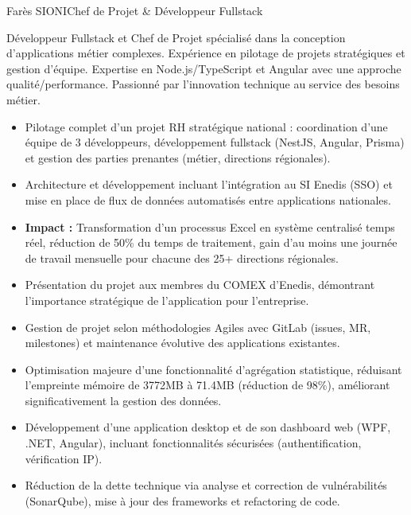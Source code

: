 \documentclass[a4paper,11pt]{article}
\begin{document}
\begin{cv}[profile][2]
{Farès SIONI}{Chef de Projet \& Développeur Fullstack}

    Développeur Fullstack et Chef de Projet spécialisé dans la conception d'applications métier complexes.
    Expérience en pilotage de projets stratégiques et gestion d'équipe.
    Expertise en Node.js/TypeScript et Angular avec une approche qualité/performance.
    Passionné par l'innovation technique au service des besoins métier.

    \begin{cvevent}[08/2023][08/2025]
        \begin{itemize}
            \item Pilotage complet d'un projet RH stratégique national : coordination d'une équipe de 3 développeurs, développement fullstack (NestJS, Angular, Prisma) et gestion des parties prenantes (métier, directions régionales).
            \item Architecture et développement incluant l'intégration au SI Enedis (SSO) et mise en place de flux de données automatisés entre applications nationales.
            \item \textbf{Impact :} Transformation d'un processus Excel en système centralisé temps réel, réduction de 50\% du temps de traitement, gain d'au moins une journée de travail mensuelle pour chacune des 25+ directions régionales.
            \item Présentation du projet aux membres du COMEX d'Enedis, démontrant l'importance stratégique de l'application pour l'entreprise.
            \item Gestion de projet selon méthodologies Agiles avec GitLab (issues, MR, milestones) et maintenance évolutive des applications existantes.
        \end{itemize}
    \end{cvevent}

\cvseparator[2]
    \begin{cvevent}[06/2023][08/2023]
        \begin{itemize}
            \item Optimisation majeure d'une fonctionnalité d'agrégation statistique, réduisant l'empreinte mémoire de 3772MB à 71.4MB (réduction de 98\%), améliorant significativement la gestion des données.
            \item Développement d'une application desktop et de son dashboard web (WPF, .NET, Angular), incluant fonctionnalités sécurisées (authentification, vérification IP).
            \item Réduction de la dette technique via analyse et correction de vulnérabilités (SonarQube), mise à jour des frameworks et refactoring de code.
        \end{itemize}
    \end{cvevent}


\end{cv}
\end{document}
